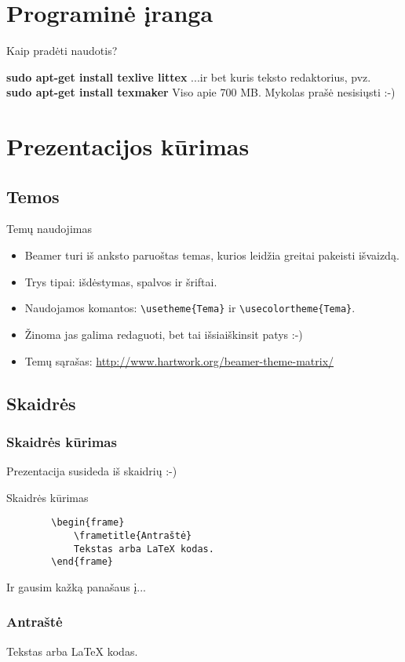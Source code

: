 \documentclass[11pt,a4paper]{beamer}
\begin{document}
\section{Programinė įranga}
\begin{frame}{Kaip pradėti naudotis?}
    \begin{center}
        \textbf{sudo apt-get install texlive littex}
        \vskip15pt
        \pause
        ...ir bet kuris teksto redaktorius, pvz.\\
        \textbf{sudo apt-get install texmaker}
        \vskip15pt
        \pause
        \alert{Viso apie 700 MB. Mykolas prašė nesisiųsti :-)}
    \end{center}
\end{frame}

\section{Prezentacijos kūrimas}
\subsection{Temos}
\begin{frame}[fragile]{Temų naudojimas}
    \begin{itemize}
        \item Beamer turi iš anksto paruoštas temas, kurios leidžia greitai pakeisti išvaizdą.
        \item Trys tipai: išdėstymas, spalvos ir šriftai.
        \item Naudojamos komantos: \verb|\usetheme{Tema}| ir \verb|\usecolortheme{Tema}|.
        \item Žinoma jas galima redaguoti, bet tai išsiaiškinsit patys :-)
        \item Temų sąrašas: \href{http://www.hartwork.org/beamer-theme-matrix/}{http://www.hartwork.org/beamer-theme-matrix/}
    \end{itemize}
\end{frame}


\subsection{Skaidrės}
\begin{frame}[fragile]
    \frametitle{Skaidrės kūrimas}
    Prezentacija susideda iš skaidrių :-) 
    \vskip10pt
    \begin{block}{Skaidrės kūrimas}
        \begin{verbatim}
        \begin{frame}
            \frametitle{Antraštė}
            Tekstas arba LaTeX kodas.
        \end{frame}
        \end{verbatim}
    \end{block}
    Ir gausim kažką panašaus į...
\end{frame}
\begin{frame}
    \frametitle{Antraštė}
    Tekstas arba LaTeX kodas.
\end{frame}
\end{document}
